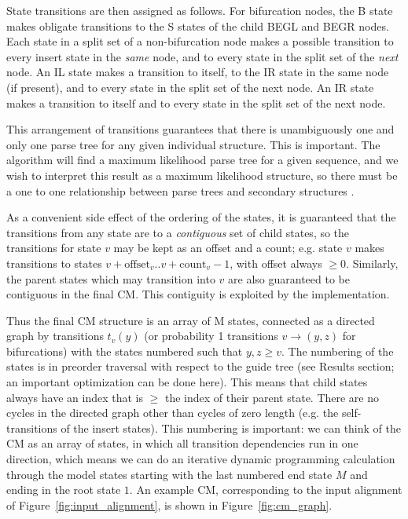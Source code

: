 \documentclass[11pt]{article}
\begin{document}
State transitions are then assigned as follows. For bifurcation nodes,
the B state makes obligate transitions to the S states of the child
BEGL and BEGR nodes. Each state in a split set of a non-bifurcation
node makes a possible transition to every insert state in the
\emph{same} node, and to every state in the split set of the
\emph{next} node. An IL state makes a transition to itself, to the IR
state in the same node (if present), and to every state in the split
set of the next node. An IR state makes a transition to itself and to
every state in the split set of the next node.

This arrangement of transitions guarantees that there is unambiguously
one and only one parse tree for any given individual structure. This
is important. The algorithm will find a maximum likelihood parse tree
for a given sequence, and we wish to interpret this result as a
maximum likelihood structure, so there must be a one to one
relationship between parse trees and secondary structures
\cite{Giegerich00}.

As a convenient side effect of the ordering of the states, it is
guaranteed that the transitions from any state are to a
\emph{contiguous} set of child states, so the transitions for state
$v$ may be kept as an offset and a count; e.g. state $v$ makes
transitions to states $v+\mbox{offset}_v..v+\mbox{count}_v-1$, with offset
always $\geq 0$.  Similarly, the parent states which may transition
into $v$ are also guaranteed to be contiguous in the final CM. This
contiguity is exploited by the implementation.

Thus the final CM structure is an array of M states, connected as a
directed graph by transitions $t_v(y)$ (or probability 1 transitions
$v \rightarrow (y,z)$ for bifurcations) with the states numbered such
that $y,z \geq v$. The numbering of the states is in preorder
traversal with respect to the guide tree (see Results section; an
important optimization can be done here). This means that child states
always have an index that is $\geq$ the index of their parent state.
There are no cycles in the directed graph other than cycles of zero
length (e.g. the self-transitions of the insert states). This
numbering is important: we can think of the CM as an array of states,
in which all transition dependencies run in one direction, which means
we can do an iterative dynamic programming calculation through the
model states starting with the last numbered end state $M$ and ending
in the root state $1$.  An example CM, corresponding to the input
alignment of Figure~\ref{fig:input_alignment}, is shown in
Figure~\ref{fig:cm_graph}.
\end{document}
